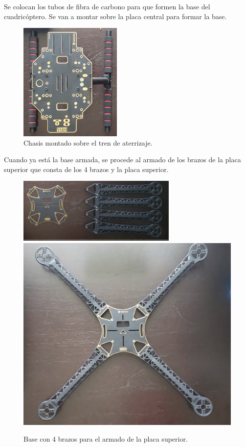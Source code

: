 \noindent Se colocan los tubos de fibra de carbono para que formen la base del cuadricóptero. Se van a montar sobre la placa central para formar la base.
\begin{figure}[H]
    \centering
    \includegraphics[width=0.45\textwidth]{imagenes/chasis-sobre-tren.png}
    \caption{Chasis montado sobre el tren de aterrizaje.}
    \label{fig:basetren}
\end{figure}
\noindent Cuando ya está la base armada, se procede al armado de los brazos de la placa superior que consta de los 4 brazos y la placa superior.

\begin{figure}[H]
    \centering
   {\includegraphics[width=0.7\textwidth]{imagenes/brazos.png}} 
    {\includegraphics[width=0.7\linewidth]{imagenes/brazos-armados.png}}
    \caption{Base con 4 brazos para el armado de la placa superior.}
    \label{fig:lora-solo}
\end{figure}

